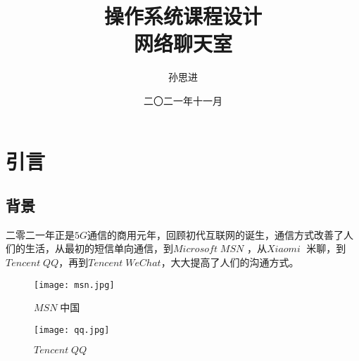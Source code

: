 \documentclass[forprint]{OSPaper}
\begin{document}

\miji{ }                                      %

\title{操作系统课程设计\\网络聊天室}
\author{孙思进}                            %
\date{二〇二一年十一月}                    %

\maketitle
\frontmatter
{}              %
\tableofcontents
\mainmatter %
\chapter{引言}
\section{背景}
二零二一年正是$ 5G $通信的商用元年，回顾初代互联网的诞生，通信方式改善了人们的生活，从最初的短信单向通信，到$ Microsoft \; MSN$ ，从$ Xiaomi \;$ 米聊，到 $Tencent \; QQ $，再到$Tencent \; WeChat$，大大提高了人们的沟通方式。
\begin{figure}[ht]
	\centering
	\texttt{[image: msn.jpg]}
	\caption{$MSN \;$中国}
	\label{fig:1}
\end{figure}

\begin{figure}[ht]
	\centering
	\texttt{[image: qq.jpg]}
	\caption{$Tencent \; QQ $}
	\label{fig:2}
\end{figure}
\end{document}
